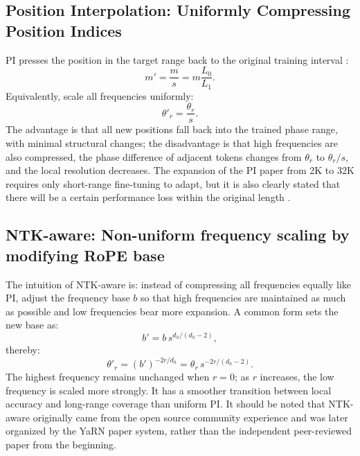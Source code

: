 \documentclass[UTF8,fontset=none,a4paper,10pt]{ctexart}
\begin{document}
\subsection{Position Interpolation: Uniformly Compressing Position Indices}

PI presses the position in the target range back to the original training interval \cite{chen2023pi}:
\begin{equation}
  m'=\frac{m}{s}=m\frac{L_0}{L_1}.
  \label{eq:pi-position}
\end{equation}
Equivalently, scale all frequencies uniformly:
\begin{equation}
  \theta'_r=\frac{\theta_r}{s}.
  \label{eq:pi-frequency}
\end{equation}
The advantage is that all new positions fall back into the trained phase range, with minimal structural changes; the disadvantage is that high frequencies are also compressed, the phase difference of adjacent tokens changes from $\theta_r$ to $\theta_r/s$, and the local resolution decreases. The expansion of the PI paper from 2K to 32K requires only short-range fine-tuning to adapt, but it is also clearly stated that there will be a certain performance loss within the original length \cite{chen2023pi}.

\subsection{NTK-aware: Non-uniform frequency scaling by modifying RoPE base}

The intuition of NTK-aware is: instead of compressing all frequencies equally like PI, adjust the frequency base $b$ so that high frequencies are maintained as much as possible and low frequencies bear more expansion. A common form sets the new base as:
\begin{equation}
  b'=b\,s^{d_h/(d_h-2)},
  \label{eq:ntk-base}
\end{equation}
thereby:
\begin{equation}
  \theta'_r=(b')^{-2r/d_h}
  =\theta_r\,s^{-2r/(d_h-2)}.
  \label{eq:ntk-frequency}
\end{equation}
The highest frequency remains unchanged when $r=0$; as $r$ increases, the low frequency is scaled more strongly. It has a smoother transition between local accuracy and long-range coverage than uniform PI. It should be noted that NTK-aware originally came from the open source community experience and was later organized by the YaRN paper system, rather than the independent peer-reviewed paper \cite{peng2024yarn} from the beginning.
\end{document}

